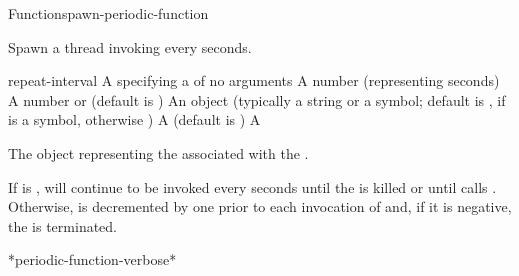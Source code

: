 \begin{functiondoc}{Function}{spawn-periodic-function}%
  { 
     
    \returns{} }
%
%

\fnsyntax

\fnpurpose Spawn a thread invoking  every
 seconds.

\fnpackage {}

\fnmodule {}

\fnargs
\begin{args}{repeat-interval}
\arg[function] A  specifying a
   of no arguments
 A number (representing seconds)
\arg[count] A number or \nil{} (default is \nil)
\arg[name] An object (typically a string or a symbol; default is
, if  is a symbol, otherwise \nil)
\arg[verbose] A 
  (default is )
\arg[thread] A 
\end{args}

\fnreturns The object representing the  associated with the
.

\fnerrors
\nothreads{}

\fndescription If  is \nil,  will continue
to be invoked every  seconds until the
  is killed or until
 calls
.  Otherwise,
 is decremented by one prior to each invocation of
 and, if it is negative, the 
is terminated.

\begin{alsos}{*periodic-function-verbose*}
\end{alsos}


\end{functiondoc}
